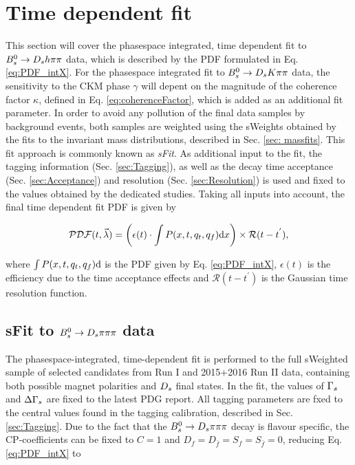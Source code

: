 \section{Time dependent fit}
\label{sec:Tfit}

This section will cover the phasespace integrated, time dependent fit to ${{B}^0_{s}}\rightarrow{\ensuremath{{D}_{s}}}{\ensuremath{h}}{\ensuremath{\pi}}{\ensuremath{\pi}}$ data, which is described by the PDF formulated in Eq. \ref{eq:PDF_intX}.
For the phasespace integrated fit to ${{B}^0_{s}}\rightarrow{\ensuremath{{D}_{s}}}{\ensuremath{K}}{\ensuremath{\pi}}{\ensuremath{\pi}}$ data, the sensitivity to the CKM phase $\gamma$ will depent on the magnitude of the coherence factor $\kappa$, defined in Eq. \ref{eq:coherenceFactor}, 
which is added as an additional fit parameter. 
In order to avoid any pollution of the final data samples by background events, both samples are weighted using the sWeights obtained by the fits to the invariant mass distributions, described in Sec. \ref{sec: massfits}.
This fit approach is commonly known as \textit{sFit}. 
As additional input to the fit, the tagging information (Sec. \ref{sec:Tagging}), 
as well as the decay time acceptance (Sec. \ref{sec:Acceptance}) and resolution (Sec. \ref{sec:Resolution}) is used and fixed to the values obtained by the dedicated studies. 
Taking all inputs into account, the final time dependent fit PDF is given by

\begin{equation}
\label{eq:TPDF_full}
\mathcal{PDF}(t,\vec{\lambda}) = \left(\epsilon(t)\cdot \int P(x,t,q_t,q_f) \text d x \right) \times \mathcal{R}(t - t^{'}),
\end{equation}

where $\int P(x,t,q_t,q_f) \text d$ is the PDF given by Eq. \ref{eq:PDF_intX}, $\epsilon(t)$ is the efficiency due to the time acceptance effects and $\mathcal{R}(t - t^{'})$ is the Gaussian time resolution function. 



\subsection{sFit to ${{B}^0_{s}}\rightarrow{\ensuremath{{D}_{s}}}{\ensuremath{\pi}}{\ensuremath{\pi}}{\ensuremath{\pi}}$ data}  
The phasespace-integrated, time-dependent fit is performed to the full sWeighted sample of selected candidates from Run I and 2015+2016 Run II data, containing both possible magnet polarities and ${{D}_{s}}$ final states.
In the fit, the values of ${\Gamma_{{s}}}$ and ${\Delta\Gamma_{{s}}}$ are fixed to the latest PDG report. All tagging parameters are fxed to the central values found in the tagging calibration, described in Sec. \ref{sec:Tagging}.
Due to the fact that the ${{B}^0_{s}}\rightarrow{\ensuremath{{D}_{s}}}{\ensuremath{\pi}}{\ensuremath{\pi}}{\ensuremath{\pi}}$ decay is flavour specific, the CP-coefficients can be fixed to $C=1$ and $D_{f} = D_{\bar{f}} = S_{f} = S_{\bar{f}} = 0$, reducing Eq. \ref{eq:PDF_intX} to

